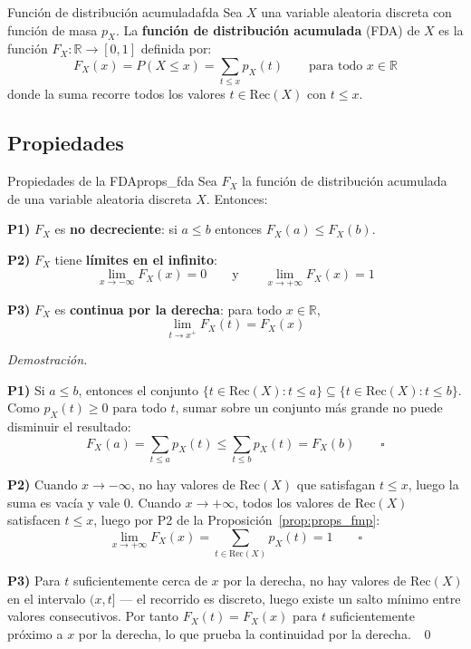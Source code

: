 \documentclass[12pt, a4paper]{book}
\renewenvironment{proof}{%
    \par\medskip\noindent\textit{Demostraci\'{o}n.}\enspace
}{\qed\par\medskip}
\numberwithin{equation}{chapter}
\begin{document}
\begin{definicion}{Función de distribución acumulada}{fda}
	Sea $X$ una variable aleatoria discreta con función de masa 
	$p_X$. La \textbf{función de distribución acumulada} (FDA) de 
	$X$ es la función $F_X : \mathbb{R} \to [0,1]$ definida por:
	\[
	F_X(x) = P(X \leq x) = \sum_{t \leq x} p_X(t) 
	\qquad \text{para todo } x \in \mathbb{R}
	\]
	donde la suma recorre todos los valores $t \in \text{Rec}(X)$ 
	con $t \leq x$.
\end{definicion}

\subsection{Propiedades}

\begin{proposicion}{Propiedades de la FDA}{props_fda}
	Sea $F_X$ la función de distribución acumulada de una variable 
	aleatoria discreta $X$. Entonces:
	
	\medskip
	\noindent\textbf{P1)} $F_X$ es \textbf{no decreciente}: si 
	$a \leq b$ entonces $F_X(a) \leq F_X(b)$.
	
	\medskip
	\noindent\textbf{P2)} $F_X$ tiene \textbf{límites en el infinito}:
	\[
	\lim_{x \to -\infty} F_X(x) = 0 \qquad \text{y} \qquad 
	\lim_{x \to +\infty} F_X(x) = 1
	\]
	
	\medskip
	\noindent\textbf{P3)} $F_X$ es \textbf{continua por la derecha}: 
	para todo $x \in \mathbb{R}$,
	\[
	\lim_{t \to x^+} F_X(t) = F_X(x)
	\]
\end{proposicion}

\begin{proof}
	\textbf{P1)} Si $a \leq b$, entonces el conjunto 
	$\{t \in \text{Rec}(X) : t \leq a\} \subseteq 
	\{t \in \text{Rec}(X) : t \leq b\}$. Como $p_X(t) \geq 0$ 
	para todo $t$, sumar sobre un conjunto más grande no puede 
	disminuir el resultado:
	\[
	F_X(a) = \sum_{t \leq a} p_X(t) \leq \sum_{t \leq b} 
	p_X(t) = F_X(b) \qquad \square
	\]
	
	\medskip
	\textbf{P2)} Cuando $x \to -\infty$, no hay valores de 
	$\text{Rec}(X)$ que satisfagan $t \leq x$, luego la suma es 
	vacía y vale $0$. Cuando $x \to +\infty$, todos los valores de 
	$\text{Rec}(X)$ satisfacen $t \leq x$, luego por P2 de la 
	Proposición~\ref{prop:props_fmp}:
	\[
	\lim_{x \to +\infty} F_X(x) = \sum_{t \in \text{Rec}(X)} 
	p_X(t) = 1 \qquad \square
	\]
	
	\medskip
	\textbf{P3)} Para $t$ suficientemente cerca de $x$ por la 
	derecha, no hay valores de $\text{Rec}(X)$ en el intervalo 
	$(x, t]$ — el recorrido es discreto, luego existe un salto 
	mínimo entre valores consecutivos. Por tanto $F_X(t) = F_X(x)$ 
	para $t$ suficientemente próximo a $x$ por la derecha, lo que 
	prueba la continuidad por la derecha. $\qedhere$
\end{proof}
\end{document}

